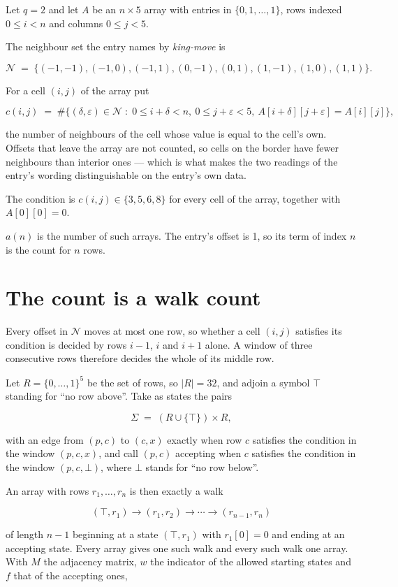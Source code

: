 \documentclass[11pt]{article}
\theoremstyle{definition}
\begin{document}
Let $q = 2$ and let $A$ be an $n \times 5$ array with entries in $\{0,1,\dots,1\}$, rows indexed $0 \le i < n$ and columns $0 \le j < 5$.

The neighbour set the entry names by {\itshape king-move} is

\[\mathcal{N} \;=\; \{(-1,-1), (-1,0), (-1,1), (0,-1), (0,1), (1,-1), (1,0), (1,1)\}.\]

For a cell $(i,j)$ of the array put

\[c(i,j) \;=\; \#\bigl\{(\delta,\varepsilon)\in\mathcal{N} \;:\; 0\le i+\delta<n,\ 0\le j+\varepsilon<5,\ A[i+\delta][j+\varepsilon] = A[i][j]\bigr\},\]

the number of neighbours of the cell whose value is equal to the cell's own. Offsets that leave the array are not counted, so cells on the border have fewer neighbours than interior ones --- which is what makes the two readings of the entry's wording distinguishable on the entry's own data.

The condition is $c(i,j) \in \{3, 5, 6, 8\}$ for every cell of the array, together with $A[0][0]=0$.

$a(n)$ is the number of such arrays. The entry's offset is 1, so its term of index $n$ is the count for $n$ rows.

\section{The count is a walk count}

Every offset in $\mathcal{N}$ moves at most one row, so whether a cell $(i,j)$ satisfies its condition is decided by rows $i-1$, $i$ and $i+1$ alone. A window of three consecutive rows therefore decides the whole of its middle row.

Let $R = \{0,\dots,1\}^{5}$ be the set of rows, so $|R| = 32$, and adjoin a symbol $\top$ standing for ``no row above''. Take as states the pairs

\[\Sigma \;=\; (R \cup \{\top\}) \times R,\]

with an edge from $(p,c)$ to $(c,x)$ exactly when row $c$ satisfies the condition in the window $(p,c,x)$, and call $(p,c)$ accepting when $c$ satisfies the condition in the window $(p,c,\bot)$, where $\bot$ stands for ``no row below''.

An array with rows $r_1,\dots,r_n$ is then exactly a walk

\[(\top,r_1) \to (r_1,r_2) \to \cdots \to (r_{n-1},r_n)\]

of length $n-1$ beginning at a state $(\top,r_1)$ with $r_1[0]=0$ and ending at an accepting state. Every array gives one such walk and every such walk one array. With $M$ the adjacency matrix, $w$ the indicator of the allowed starting states and $f$ that of the accepting ones,
\end{document}
